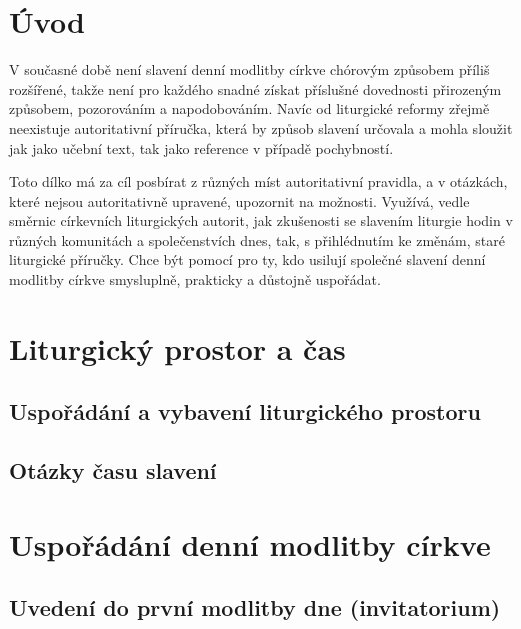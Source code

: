\documentclass[a5paper, twoside]{article}
\newcommand{\titulniStranka}{
  \pagestyle{empty} %
  \begin{titlepage}
    \begin{center}
      
      \vspace*{5cm}
      
      {\Large\textbf{\nazev}}
          
      \vspace{1cm}
      
      \autor
      
      \vfill
      In adiutorium
      
      \onlyyeardate \today
    \end{center}
  \end{titlepage}
}
\newcommand{\autor}{Jakub Pavlík}
\newcommand{\nazev}{
  {\Huge Manuál}
  \vspace{1cm}

  ke společnému slavení\\
  denní modlitby církve
}
\begin{document}
\titulniStranka
\prazdnaStranka

\section*{Úvod}

V současné době není slavení denní modlitby církve chórovým způsobem
příliš rozšířené, takže není pro každého snadné získat příslušné
dovednosti přirozeným způsobem, pozorováním a napodobováním.
Navíc od liturgické reformy zřejmě neexistuje autoritativní příručka,
která by způsob slavení určovala a mohla sloužit jak jako učební text,
tak jako reference v případě pochybností.

Toto dílko má za cíl posbírat z různých míst autoritativní pravidla,
a v otázkách, které nejsou autoritativně upravené, upozornit na možnosti.
Využívá, vedle směrnic církevních liturgických autorit, jak zkušenosti 
se slavením liturgie hodin v různých komunitách
a společenstvích dnes, tak, s přihlédnutím ke změnám, staré liturgické
příručky.
Chce být pomocí pro ty, kdo usilují společné slavení denní modlitby církve
smysluplně, prakticky a důstojně uspořádat.

\section{Liturgický prostor a čas}
\subsection{Uspořádání a vybavení liturgického prostoru}
\subsection{Otázky času slavení}





\section{Uspořádání denní modlitby církve}
\subsection{Uvedení do první modlitby dne (invitatorium)}
\end{document}
